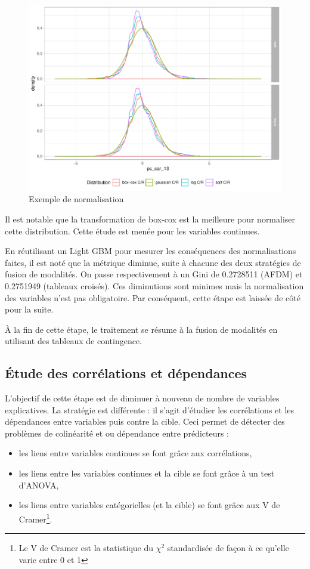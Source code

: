 \documentclass[french]{article}
\begin{document}
\begin{multicols}{2}
\begin{figure}[H] \centering
  \includegraphics[width = \columnwidth]{img/ex_normalisation}
  \caption{Exemple de normalisation}
\end{figure}

Il est notable que la transformation de box-cox est la meilleure pour normaliser cette distribution. Cette étude est menée pour les variables continues.

En réutilisant un Light GBM pour mesurer les conséquences des normalisations faites, il est noté que la métrique diminue, suite à chacune des deux stratégies de fusion de modalités. On passe respectivement à un Gini de 0.2728511 (AFDM) et 0.2751949 (tableaux croisés). Ces diminutions sont minimes mais la normalisation des variables n'est pas obligatoire. Par conséquent, cette étape est laissée de côté pour la suite. 

À la fin de cette étape, le traitement se résume à la fusion de modalités en utilisant des tableaux de contingence.

\subsection{Étude des corrélations et dépendances}

L'objectif de cette étape est de diminuer à nouveau de nombre de variables explicatives. La stratégie est différente : il s'agit d'étudier les corrélations et les dépendances entre variables puis contre la cible. Ceci permet de détecter des problèmes de colinéarité et ou dépendance entre prédicteurs :

\begin{itemize}
    \item les liens entre variables continues se font grâce aux corrélations,
    \item les liens entre les variables continues et la cible se font grâce à un test d'ANOVA,
    \item les liens entre variables catégorielles (et la cible) se font grâce aux V de Cramer\footnote{Le V de Cramer est la statistique du $\chi^2$ standardisée de façon à ce qu'elle varie entre 0 et 1}.
\end{itemize}


\end{multicols}
\end{document}
